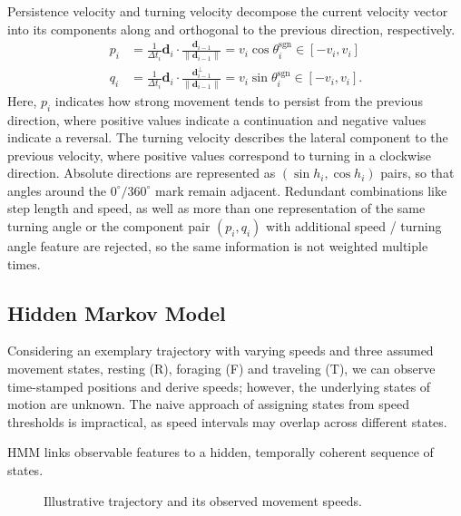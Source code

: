Persistence velocity and turning velocity decompose the current velocity vector into its components along and orthogonal to the previous direction, respectively.
\begin{align}
    p_i
    &=
    \frac{1}{\Delta t_i}\mathbf d_i\cdot
    \frac{\mathbf d_{i-1}}{\lVert\mathbf d_{i-1}\rVert}
    =v_i\cos\theta_i^{\mathrm{sgn}} \in [-v_i, v_i]
    \label{eq:persistence-velocity}\\
q_i
    &=
    \frac{1}{\Delta t_i}\mathbf d_i\cdot
    \frac{\mathbf d_{i-1}^{\perp}}
         {\lVert\mathbf d_{i-1}\rVert}
    =v_i\sin\theta_i^{\mathrm{sgn}}
    \in[-v_i,v_i].
    \label{eq:turning-velocity}
\end{align}
Here, $p_i$ indicates how strong movement tends to persist from the previous direction, where positive values indicate a continuation and negative values indicate a reversal.
The turning velocity describes the lateral component to the previous velocity, where positive values correspond to turning in a clockwise direction.
Absolute directions are represented as $(\sin h_i,\cos h_i)$ pairs, so that angles around the $0^{\circ} / 360^{\circ}$ mark remain adjacent.
Redundant combinations like step length and speed, as well as more than one representation of the same turning angle or the component pair $(p_i,q_i)$ with additional speed / turning angle feature are rejected,
so the same information is not weighted multiple times.


\subsection{Hidden Markov Model}
\label{subsec:hmm}
Considering an exemplary trajectory with varying speeds and three assumed movement states, resting (R), foraging (F) and traveling (T),
we can observe time-stamped positions and derive speeds; however, the underlying states of motion are unknown.
The naive approach of assigning states from speed thresholds is impractical, as speed intervals may overlap across different states.

HMM links observable features to a hidden, temporally coherent sequence of states.

\begin{figure}[htbp]
    \centering
    \caption{Illustrative trajectory and its observed movement speeds.}
    \label{fig:hmm-example}
\end{figure}


